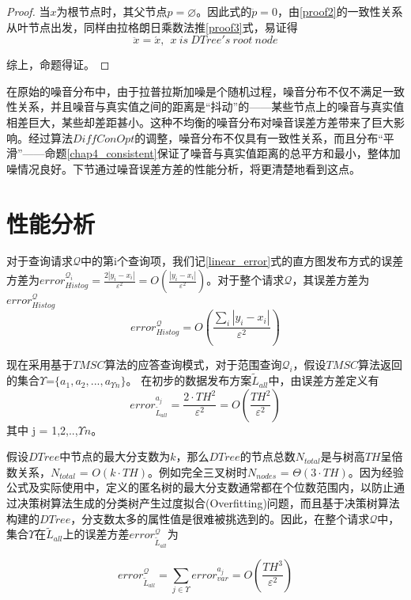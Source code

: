 \begin{proof}
	当$x$为根节点时，其父节点$p = \varnothing$。因此\label{proof1}式的$\ddot{p} = 0$，由\ref{proof2}的一致性关系从叶节点出发，同样由拉格朗日乘数法推\ref{proof3}式，易证得
	\[
		\ddot{x} = \acute{x},\ \ x\ is\ DTree's\ root\ node
	\]
	
	综上，命题得证。
\end{proof}

在原始的噪音分布中，由于拉普拉斯加噪是个随机过程，噪音分布不仅不满足一致性关系，并且噪音与真实值之间的距离是“抖动”的——某些节点上的噪音与真实值相差巨大，某些却差距甚小。这种不均衡的噪音分布对噪音误差方差带来了巨大影响。经过算法$DiffConOpt$的调整，噪音分布不仅具有一致性关系，而且分布“平滑”——命题\ref{chap4_consistent}保证了噪音与真实值距离的总平方和最小，整体加噪情况良好。下节通过噪音误差方差的性能分析，将更清楚地看到这点。

\section{性能分析}
\label{theory analysis}
对于查询请求$\mathcal{Q}$中的第i个查询项，我们记\ref{linear_error}式的直方图发布方式的误差方差为$error_{Histog}^{\mathcal{Q}_{i}} = \frac{2|y_{i}-x_{i}|}{\varepsilon^2} = O(\frac{|y_{i}-x_{i}|}{\varepsilon^2})$。对于整个请求$\mathcal{Q}$，其误差方差为$error_{Histog}^{\mathcal{Q}}$
\begin{equation}
\label{linear_error2}
error_{Histog}^{\mathcal{Q}} = O(\frac{\sum\limits_i |y_{i}-x_{i}|}{\varepsilon^2})
\end{equation}

现在采用基于$TMSC$算法的应答查询模式，对于范围查询$\mathcal{Q}_{i}$，假设$TMSC$算法返回的集合$\Upsilon$=$\{a_{1},a_{2},...,a_{\Upsilon n}\}$。
在初步的数据发布方案$\tilde{L}_{all}$中，由误差方差定义有
\[
	error_{\tilde{L}_{all}}^{a_{j}} = \frac{2 \cdotp TH^2}{\varepsilon^2} = O(\frac{TH^2}{\varepsilon^2})
\]
其中 j = 1,2,..,$\Upsilon n$。

假设$DTree$中节点的最大分支数为$k$，那么$DTree$的节点总数$N_{total}$是与树高$TH$呈倍数关系，$N_{total}$ = $O(k \cdotp TH)$。例如完全三叉树时$N_{nodes}$ = $\Theta(3 \cdotp TH)$。因为经验公式及实际使用中，定义的匿名树的最大分支数通常都在个位数范围内，以防止通过决策树算法生成的分类树产生过度拟合(Overfitting)\cite{overfitting}问题，而且基于决策树算法构建的$DTree$，分支数太多的属性值是很难被挑选到的。因此，在整个请求$\mathcal{Q}$中，集合$\Upsilon$在$\tilde{L}_{all}$上的误差方差$error_{\tilde{L}_{all}}^{\mathcal{Q}}$为

\[
\label{Lall_error}
error_{\tilde{L}_{all}}^{\mathcal{Q}} = \sum\limits_{j \in \Upsilon} error_{var}^{a_{j}}=O(\frac{TH^3}{\varepsilon^2})
\]

